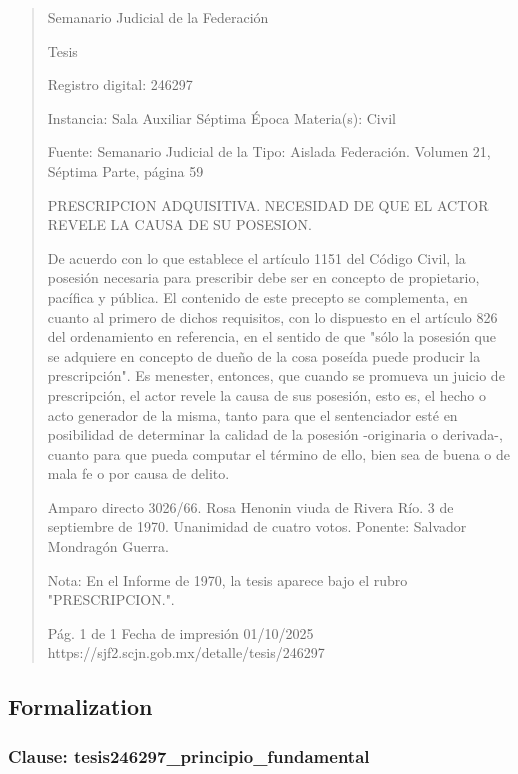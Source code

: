 \documentclass[11pt,a4paper]{article}
\begin{document}
\begin{quote}
                                                   Semanario Judicial de la Federación

                                                  Tesis

 Registro digital: 246297

 Instancia: Sala Auxiliar         Séptima Época                        Materia(s): Civil

                                  Fuente: Semanario Judicial de la  Tipo: Aislada
                                  Federación.
                                  Volumen 21, Séptima Parte, página
                                  59


PRESCRIPCION ADQUISITIVA. NECESIDAD DE QUE EL ACTOR REVELE LA CAUSA DE SU
POSESION.


De acuerdo con lo que establece el artículo 1151 del Código Civil, la posesión necesaria para
prescribir debe ser en concepto de propietario, pacífica y pública. El contenido de este precepto se
complementa, en cuanto al primero de dichos requisitos, con lo dispuesto en el artículo 826 del
ordenamiento en referencia, en el sentido de que "sólo la posesión que se adquiere en concepto de
dueño de la cosa poseída puede producir la prescripción". Es menester, entonces, que cuando se
promueva un juicio de prescripción, el actor revele la causa de sus posesión, esto es, el hecho o
acto generador de la misma, tanto para que el sentenciador esté en posibilidad de determinar la
calidad de la posesión -originaria o derivada-, cuanto para que pueda computar el término de ello,
bien sea de buena o de mala fe o por causa de delito.


Amparo directo 3026/66. Rosa Henonin viuda de Rivera Río. 3 de septiembre de 1970. Unanimidad
de cuatro votos. Ponente: Salvador Mondragón Guerra.

Nota: En el Informe de 1970, la tesis aparece bajo el rubro "PRESCRIPCION.".




                                             Pág. 1 de 1            Fecha de impresión 01/10/2025
  https://sjf2.scjn.gob.mx/detalle/tesis/246297

\end{quote}

\subsection{Formalization}

\subsubsection{Clause: tesis246297\_principio\_fundamental}
\end{document}

